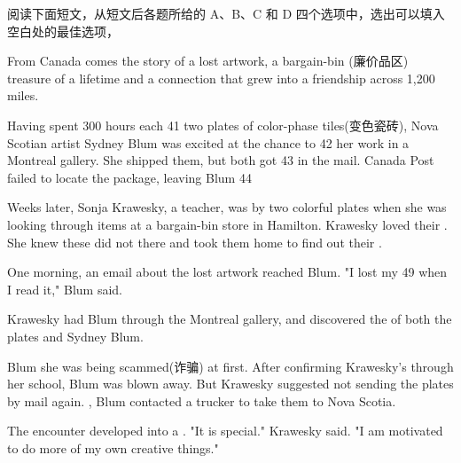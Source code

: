 \documentclass{英语试卷}
\begin{document}
\par 阅读下面短文，从短文后各题所给的 A、B、C 和 D 四个选项中，选出可以填入空白处的最佳选项，\par
\par From Canada comes the story of a lost artwork, a bargain-bin (廉价品区) treasure of a lifetime and a connection that grew into a friendship across 1,200 miles.\par
\par Having spent 300 hours each \blanknum{} 41 \blanknum{} two plates of color-phase tiles(变色瓷砖), Nova Scotian artist Sydney Blum was excited at the chance to \blanknum{} 42 \blanknum{} her work in a Montreal gallery. She shipped them, but both got \blanknum{} 43 \blanknum{} in the mail. Canada Post failed to locate the package, leaving Blum \blanknum{} 44\par
\par Weeks later, Sonja Krawesky, a teacher, was  by two colorful plates when she was looking through items at a bargain-bin store in Hamilton. Krawesky loved their . She knew these did not  there and took them home to find out their .\par
\par One morning, an email about the lost artwork reached Blum. "I lost my 49 when I read it," Blum said.\par
\par Krawesky had  Blum through the Montreal gallery, and discovered the  of both the plates and Sydney Blum.\par
\par Blum  she was being scammed(诈骗) at first. After confirming Krawesky's  through her school, Blum was blown away. But Krawesky suggested not sending the plates by mail again. , Blum contacted a trucker to take them to Nova Scotia.\par
\par The encounter developed into a . "It is special." Krawesky said. "I am motivated to do more of my own creative things."\par
{}
\end{document}
